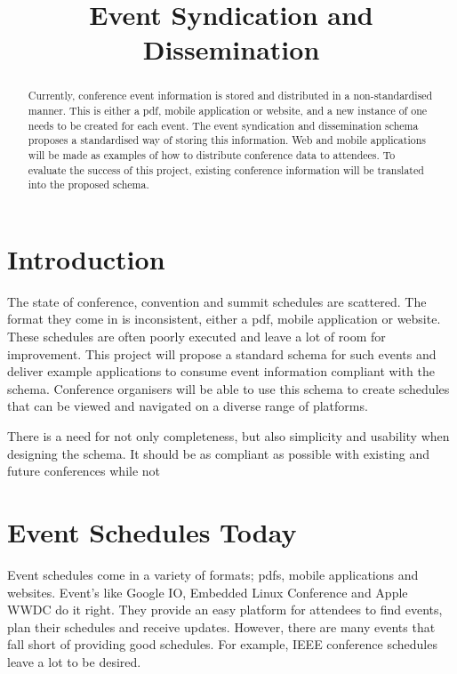 \documentclass{article}
\title{Event Syndication and Dissemination}
\begin{document}


\maketitle

\begin{abstract}
Currently, conference event information is stored and distributed in a non-standardised manner. This is either a pdf, mobile application or website, and a new instance of one needs to be created for each event. The event syndication and dissemination schema proposes a standardised way of storing this information. Web and mobile applications will be made as examples of how to distribute conference data to attendees. To evaluate the success of this project, existing conference information will be translated into the proposed schema.
\end{abstract}


\section{Introduction}
The state of conference, convention and summit schedules are scattered. The format they come in is inconsistent, either a pdf, mobile application or website. These schedules are often poorly executed and leave a lot of room for improvement. This project will propose a standard schema for such events and deliver example applications to consume event information compliant with the schema. Conference organisers will be able to use this schema to create schedules that can be viewed and navigated on a diverse range of platforms.

There is a need for not only completeness, but also simplicity and usability when designing the schema. It should be as compliant as possible with existing and future conferences while not

\section{Event Schedules Today}
Event schedules come in a variety of formats; pdfs, mobile applications and websites. Event's like Google IO\cite{googleIO2015}, Embedded Linux Conference\cite{embeddedlinuxconference2015} and Apple WWDC\cite{apple2014wwdc} do it right. They provide an easy platform for attendees to find events, plan their schedules and receive updates. However, there are many events that fall short of providing good schedules. For example, IEEE conference schedules \cite{ieeeIMC2014,ieeePSC2015,ieeeICC2014} leave a lot to be desired.
\end{document}
